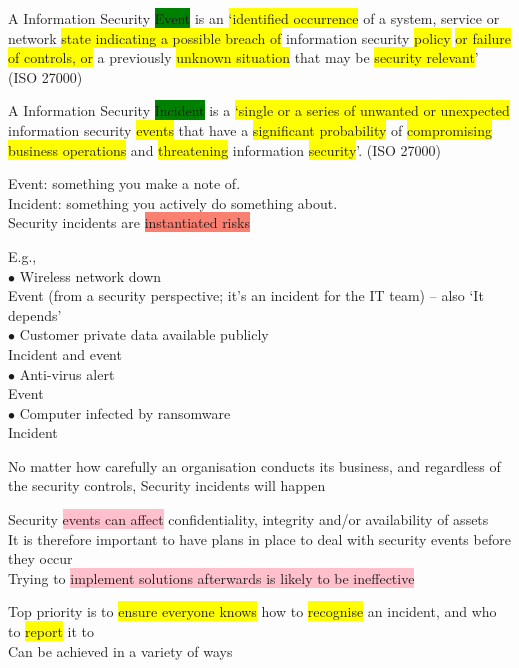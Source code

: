 \documentclass[tikz,border=10pt]{project_plan}
\newcommand{\bulletPoint}{\hspace{-3.1pt}$\bullet$ \hspace{5pt}}
\begin{document}
A Information Security \colorbox{green}{Event} is an \colorbox{yellow}{‘identified occurrence} of a system, service
or network \colorbox{yellow}{state indicating a possible breach of} information security \colorbox{yellow}{policy}
\colorbox{yellow}{or failure of controls, or} a previously \colorbox{yellow}{unknown situation} that may be
\colorbox{yellow}{security relevant}’ (ISO 27000)

A Information Security \colorbox{green}{Incident} is a \colorbox{yellow}{‘single or a series of unwanted or
  unexpected} information security \colorbox{yellow}{events} that have a \colorbox{yellow}{significant probability} of
\colorbox{yellow}{compromising business operations} and \colorbox{yellow}{threatening} information \colorbox{yellow}{security}’.
(ISO 27000)

Event: something you make a note of.\\
Incident: something you actively do something about.\\
Security incidents are \colorbox{Salmon}{instantiated risks}

E.g.,\\
\bulletPoint Wireless network down\\
Event (from a security perspective; it’s an incident for the IT team) – also ‘It depends’ \\
\bulletPoint Customer private data available publicly\\
Incident and event\\
\bulletPoint Anti-virus alert\\
Event\\
\bulletPoint Computer infected by ransomware\\
Incident

\newpage

No matter how carefully an organisation conducts its business, and regardless of the security controls,
Security incidents will happen

Security \colorbox{pink}{events can affect} confidentiality, integrity and/or availability of assets\\
It is therefore important to have plans in place to deal with security events before they occur\\
Trying to \colorbox{pink}{implement solutions afterwards is likely to be ineffective}

Top priority is to \colorbox{yellow}{ensure everyone knows}
how to \colorbox{yellow}{recognise} an incident, and who to \colorbox{yellow}{report} it to\\
Can be achieved in a variety of ways
\end{document}
